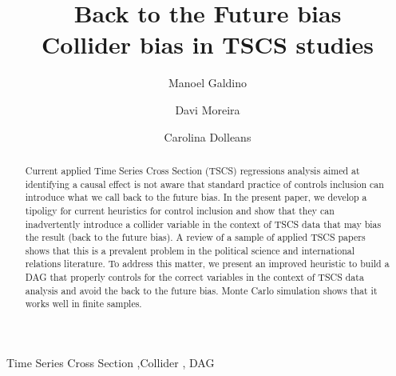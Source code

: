 \documentclass[
  super,
  preprint,
  3p]{elsarticle}
\begin{document}
\begin{frontmatter}
\title{Back to the Future bias \\\large{Collider bias in TSCS studies} }
\author[1]{Manoel Galdino%
%
}
\author[2]{Davi Moreira%
%
}
\author[3]{Carolina Dolleans%
%
}


        
\begin{abstract}
Current applied Time Series Cross Section (TSCS) regressions analysis
aimed at identifying a causal effect is not aware that standard practice
of controls inclusion can introduce what we call back to the future
bias. In the present paper, we develop a tipoligy for current heuristics
for control inclusion and show that they can inadvertently introduce a
collider variable in the context of TSCS data that may bias the result
(back to the future bias). A review of a sample of applied TSCS papers
shows that this is a prevalent problem in the political science and
international relations literature. To address this matter, we present
an improved heuristic to build a DAG that properly controls for the
correct variables in the context of TSCS data analysis and avoid the
back to the future bias. Monte Carlo simulation shows that it works well
in finite samples.
\end{abstract}





\begin{keyword}
    Time Series Cross Section \sep Collider \sep 
    DAG
\end{keyword}
\end{frontmatter}
    \ifdefined\Shaded\renewenvironment{Shaded}{\begin{tcolorbox}[sharp corners, boxrule=0pt, frame hidden, breakable, borderline west={3pt}{0pt}{shadecolor}, enhanced, interior hidden]}{\end{tcolorbox}}\fi
\end{document}
